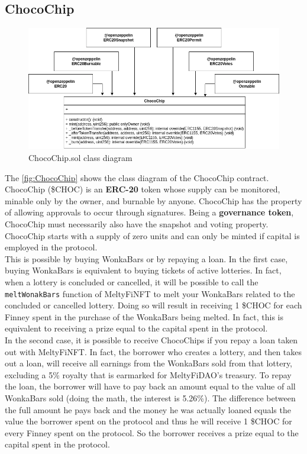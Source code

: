 \subsection{ChocoChip}
\begin{figure}[h]
    \centering
    \includegraphics[width=\textwidth]{figures/ChocoChip_class_diagram.png}
    \caption{ChocoChip.sol class diagram}
    \label{fig:ChocoChip}
\end{figure}
The \autoref{fig:ChocoChip} shows the class diagram of the ChocoChip contract. ChocoChip (\$CHOC) is an \textbf{ERC-20} token whose supply can be monitored, minable only by the owner, and burnable by anyone. ChocoChip has the property of allowing approvals to occur through signatures. Being a \textbf{governance token}, ChocoChip must necessarily also have the snapshot and voting property. ChocoChip starts with a supply of zero units and can only be minted if capital is employed in the protocol. 
\\
\indent This is possible by buying WonkaBars or by repaying a loan. In the first case, buying WonkaBars is equivalent to buying tickets of active lotteries. In fact, when a lottery is concluded or cancelled, it will be possible to call the \texttt{meltWonakBars} function of MeltyFiNFT to melt your WonkaBars related to the concluded or cancelled lottery. Doing so will result in receiving 1 \$CHOC for each Finney spent in the purchase of the WonkaBars being melted. In fact, this is equivalent to receiving a prize equal to the capital spent in the protocol. 
\\
\indent In the second case, it is possible to receive ChocoChips if you repay a loan taken out with MeltyFiNFT. In fact, the borrower who creates a lottery, and then takes out a loan, will receive all earnings from the WonkaBars sold from that lottery, excluding a 5\% royalty that is earmarked for MeltyFiDAO's treasury. To repay the loan, the borrower will have to pay back an amount equal to the value of all WonkaBars sold (doing the math, the interest is 5.26\%). The difference between the full amount he pays back and the money he was actually loaned equals the value the borrower spent on the protocol and thus he will receive 1 \$CHOC for every Finney spent on the protocol. So the borrower receives a prize equal to the capital spent in the protocol. 
